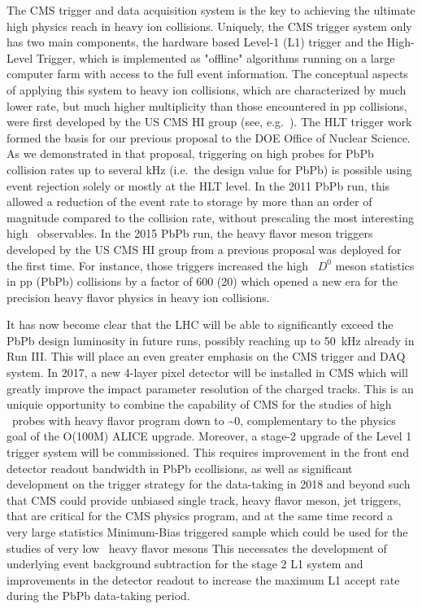 The CMS trigger and data acquisition system is the key to achieving the ultimate high \pt physics reach in heavy ion collisions.
Uniquely, the CMS trigger system only has two main components, the hardware based Level-1 (L1) trigger and the High-Level Trigger,
which is implemented as "offline" algorithms running on a large computer farm with access to the full event information.  
The conceptual aspects of applying this system to heavy ion collisions, which are characterized by much lower rate, but much higher multiplicity than those encountered in pp collisions, were first developed by the US CMS HI group (see, e.g.\ \cite{Roland:2007is}). The HLT trigger work 
formed the basis for our previous proposal to the DOE Office of Nuclear Science. As we demonstrated in that proposal, triggering on high \pt probes for PbPb collision rates up to several kHz (i.e.\ the design value for PbPb) is possible using event rejection 
solely or mostly at the HLT level. In the 2011 PbPb run, this allowed a reduction of the event rate to storage by more than
an order of magnitude compared to the collision rate, without prescaling the most interesting high \pt\ observables. In the 2015 PbPb run, the heavy flavor meson triggers developed by the US CMS HI group from a previous proposal was deployed for the first time. For instance, those triggers increased the high \pt\ $D^0$ meson statistics in pp (PbPb) collisions by a factor of 600 (20) which opened a new era for the precision heavy flavor physics in heavy ion collisions.

It has now become clear that the LHC will be able to significantly exceed the PbPb design luminosity in future runs, possibly reaching up to 50~kHz already in Run III. This will place an even greater emphasis on the CMS trigger and DAQ system. 
In 2017, a new 4-layer pixel detector will be installed in CMS which will greatly improve the impact parameter resolution of the charged tracks. This is an uniquie opportunity to combine the capability of CMS for the studies of high \pt\ probes with heavy flavor program down to \pt\sim 0, complementary to the physics goal of the O(100M) ALICE upgrade. Moreover, a stage-2 upgrade of the Level 1 trigger system will be commissioned. This requires improvement in the front end detector readout bandwidth in PbPb ccollisions, as well as significant development on the trigger strategy for the data-taking in 2018 and beyond such that CMS could provide unbiased single track, heavy flavor meson, jet triggers, that are critical for the CMS physics program, and at the same time record a very large statistics Minimum-Bias triggered sample which could be used for the studies of very low \pt\ heavy flavor mesons This necessates the development of underlying event background subtraction for the stage 2 L1 system and improvements in the detector readout to increase the maximum L1 accept rate during the PbPb data-taking period.

